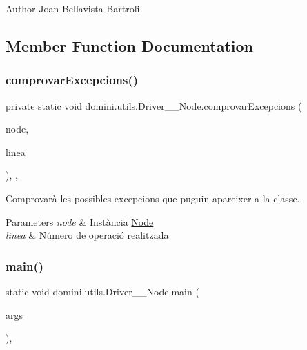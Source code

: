 \begin{DoxyAuthor}{Author}
Joan Bellavista Bartroli 
\end{DoxyAuthor}


\subsection{Member Function Documentation}
\mbox{\label{classdomini_1_1utils_1_1Driver____Node_a9fdd311953250227bb70d67cbf20bbb4}} 
\subsubsection{\texorpdfstring{comprovar\+Excepcions()}{comprovarExcepcions()}}
{\footnotesize\ttfamily private static void domini.\+utils.\+Driver\+\_\+\+\_\+\+Node.\+comprovar\+Excepcions (\begin{DoxyParamCaption}\item[{\hyperlink{classdomini_1_1utils_1_1Node}{Node}}]{node,  }\item[{String}]{linea }\end{DoxyParamCaption})\hspace{0.3cm}{\ttfamily [inline]}, {\ttfamily [static]}, {\ttfamily [private]}}



Comprovarà les possibles excepcions que puguin apareixer a la classe. 


\begin{DoxyParams}{Parameters}
{\em node} & Instància \hyperlink{classdomini_1_1utils_1_1Node}{Node} \\
\hline
{\em linea} & Número de operació realitzada \\
\hline
\end{DoxyParams}
\mbox{\label{classdomini_1_1utils_1_1Driver____Node_abfb5f35b8100dec9d147a79af04df017}} 
\subsubsection{\texorpdfstring{main()}{main()}}
{\footnotesize\ttfamily static void domini.\+utils.\+Driver\+\_\+\+\_\+\+Node.\+main (\begin{DoxyParamCaption}\item[{String \mbox{[}$\,$\mbox{]}}]{args }\end{DoxyParamCaption})\hspace{0.3cm}{\ttfamily [inline]}, {\ttfamily [static]}}

